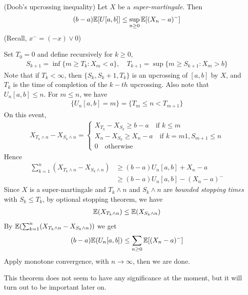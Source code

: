 \documentclass[10pt,a4paper]{report}
\newenvironment{proof}
{\begin{changemargin}{1cm}{0.5cm} 
	}%
	{\end{changemargin}
}
\begin{document}
(Doob's upcrossing inequality) Let $X$ be a \emph{super-martingale}. Then
\begin{align*}
(b-a) \mathbb{E}[U[a,b]] \leq \sup_{n\geq 0} \mathbb{E}[(X_n-a)^{-}]
\end{align*}
(Recall, $x^- = (-x) \vee 0$)
\begin{proof}
\pf Set $T_0 =0$ and define recursively for $k\geq 0$,
\begin{align*}
S_{k+1} = \inf \{m\geq T_k : X_m <a \}, \quad T_{k+1} = \sup \{m\geq S_{k+1} : X_m >b \}
\end{align*}
Note that if $T_k < \infty$, then $\{S_k, S_{k}+1, T_k \}$ is an upcrossing of $[a,b]$ by $X$, and $T_k$ is the time of completion of the $k-th$ upcrossing.
\quad Also note that $U_n [a,b] \leq n$. For $m\leq n$, we have
\begin{align*}
\{U_n[a,b] =m \} = \{T_m \leq n < T_{m+1} \}
\end{align*}
On this event,
\begin{align*}
X_{T_k \wedge n}  - X_{S_k \wedge n} = \begin{cases}
X_{T_k} - X_{S_k} \geq b-a \quad \text{if } k\leq m \\
X_n - X_{S_k} \geq X_n -a \quad \text{if } k =m1, S_{m+1} \leq n \\
0 \quad \text{otherwise}
\end{cases}
\end{align*}
Hence
\begin{align*}
\sum_{k=1}^n (X_{T_k \wedge n} - X_{S_k \wedge n}) &\geq (b-a) U_n[a,b] + X_n - a \\
&\geq (b-a)U_n[a,b] -(X_n -a)^-
\end{align*}
Since $X$ is a super-martingale and $T_k \wedge n$ and $S_k \wedge n$ are \emph{bounded stopping times} with $S_k \leq T_k$, by optional stopping theorem, we have
\begin{align*}
\mathbb{E} (X_{T_k \wedge n})\leq \mathbb{E}(X_{S_k \wedge n})
\end{align*}
By $\mathbb{E}(\sum_{k=1}^n (X_{T_k \wedge n} - X_{S_k \wedge n}))$ we get
\begin{align*}
(b-a) \mathbb{E}(U_n[a,b]) \leq \sum_{n\geq 0} \mathbb{E}[(X_n-a)^-]
\end{align*}
Apply monotone convergence, with $n\rightarrow \infty$, then we are done.

\eop
\end{proof}
\s

This theorem does not seem to have any significance at the moment, but it will turn out to be important later on.
\end{document}
